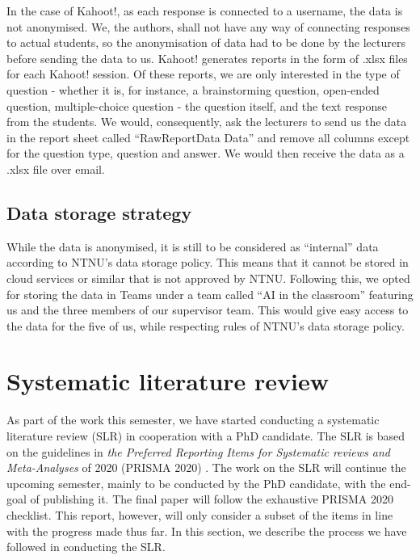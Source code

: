 In the case of Kahoot!, as each response is connected to a username, the data is not anonymised. We, the authors, shall not have any way of connecting responses to actual students, so the anonymisation of data had to be done by the lecturers before sending the data to us. Kahoot! generates reports in the form of .xlsx files for each Kahoot! session. Of these reports, we are only interested in the type of question - whether it is, for instance, a brainstorming question, open-ended question, multiple-choice question - the question itself, and the text response from the students. We would, consequently, ask the lecturers to send us the data in the report sheet called ``RawReportData Data'' and remove all columns except for the question type, question and answer. We would then receive the data as a .xlsx file over email.

\subsection{Data storage strategy}
While the data is anonymised, it is still to be considered as ``internal'' data according to NTNU's data storage policy. This means that it cannot be stored in cloud services or similar that is not approved by NTNU. Following this, we opted for storing the data in Teams under a team called ``AI in the classroom'' featuring us and the three members of our supervisor team. This would give easy access to the data for the five of us, while respecting rules of NTNU's data storage policy.

\section{Systematic literature review}
As part of the work this semester, we have started conducting a systematic literature review (SLR) in cooperation with a PhD candidate. The SLR is based on the guidelines in \textit{the Preferred Reporting Items for Systematic reviews and Meta-Analyses} of 2020 (PRISMA 2020) \cite{prisma2020}. The work on the SLR will continue the upcoming semester, mainly to be conducted by the PhD candidate, with the end-goal of publishing it. The final paper will follow the exhaustive PRISMA 2020 checklist. This report, however, will only consider a subset of the items in line with the progress made thus far. In this section, we describe the process we have followed in conducting the SLR.

